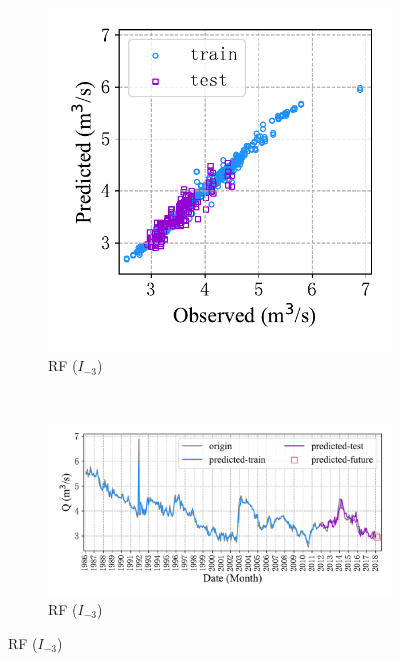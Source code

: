 \begin{figure}[!htbp]
\begin{subfigure}[b]{0.615\textwidth}
  \end{subfigure}
  \\
  \centering
  \begin{subfigure}[b]{0.305\textwidth}
    \includegraphics[width=\textwidth]{Img/chap4_spr/out2/spr_scatter_in_3_out_2_rf.pdf}
    \vspace{-1.2cm}
    \caption{RF ($I_{-3}$)}
    \label{fig:spr_scatter_in_3_out_2_rf}
  \end{subfigure}
  ~
  \begin{subfigure}[b]{0.615\textwidth}
    \includegraphics[width=\textwidth]{Img/chap4_spr/out2/spr_series_in_3_out_2_rf.pdf}
    \vspace{-1.2cm}
    \caption{RF ($I_{-3}$)}
    \label{fig:spr_series_in_3_out_2_rf}

\end{subfigure}
\end{figure}
